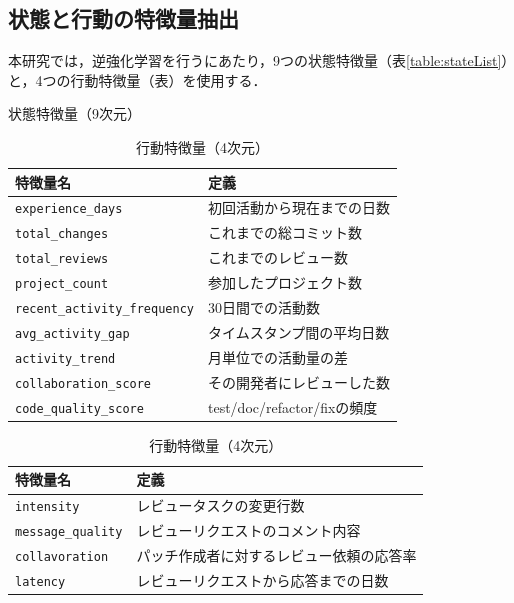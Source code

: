 \documentclass[submit,techrep,noauthor]{ipsj}
\begin{document}
\subsection{状態と行動の特徴量抽出}
本研究では，逆強化学習を行うにあたり，9つの状態特徴量（表\ref{table:stateList}）と，4つの行動特徴量（表\label{table:actionList}）を使用する．
\begin{table}[t]
    \centering
    \label{table:stateList}
    \caption{状態特徴量（9次元）}
    \begin{tabular}{@{}ll@{}}
        \toprule
        \textbf{特徴量名} & \textbf{定義} \\
        \midrule
        \texttt{experience\_days} & 初回活動から現在までの日数 \\
        \texttt{total\_changes} & これまでの総コミット数 \\
        \texttt{total\_reviews} & これまでのレビュー数 \\
        \texttt{project\_count} & 参加したプロジェクト数 \\
        \texttt{recent\_activity\_frequency} & 30日間での活動数 \\
        \texttt{avg\_activity\_gap} & タイムスタンプ間の平均日数 \\
        \texttt{activity\_trend} & 月単位での活動量の差\\
        \texttt{collaboration\_score} & その開発者にレビューした数 \\ 
        \texttt{code\_quality\_score} & test/doc/refactor/fixの頻度 \\
        \bottomrule
    \end{tabular}


    \centering
    \caption{行動特徴量（4次元）}
        \begin{tabular}{@{}ll@{}}
        \toprule
        \label{table:actionList}
        \textbf{特徴量名} & \textbf{定義} \\
        \midrule
        \texttt{intensity} & レビュータスクの変更行数 \\
        \texttt{message\_quality} & レビューリクエストのコメント内容 \\
        \texttt{collavoration} & パッチ作成者に対するレビュー依頼の応答率 \\
        \texttt{latency} & レビューリクエストから応答までの日数 \\
        \bottomrule
    \end{tabular}
\end{table}
\end{document}
